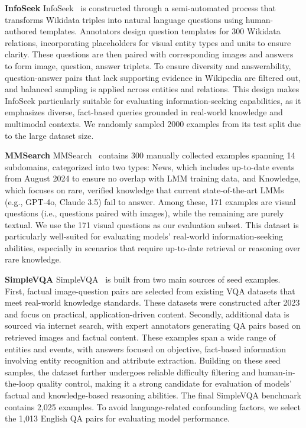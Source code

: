\documentclass{article}
\begin{document}
\textbf{InfoSeek} InfoSeek~\cite{dataset/infoseek} is constructed through a semi-automated process that transforms Wikidata triples into natural language questions using human-authored templates. Annotators design question templates for 300 Wikidata relations, incorporating placeholders for visual entity types and units to ensure clarity. These questions are then paired with corresponding images and answers to form {image, question, answer} triplets. To ensure diversity and answerability, question-answer pairs that lack supporting evidence in Wikipedia are filtered out, and balanced sampling is applied across entities and relations. This design makes InfoSeek particularly suitable for evaluating information-seeking capabilities, as it emphasizes diverse, fact-based queries grounded in real-world knowledge and multimodal contexts. We randomly sampled 2000 examples from its test split due to the large dataset size.

\textbf{MMSearch} MMSearch~\cite{vision-rag/mmsearch} contains 300 manually collected examples spanning 14 subdomains, categorized into two types: News, which includes up-to-date events from August 2024 to ensure no overlap with LMM training data, and Knowledge, which focuses on rare, verified knowledge that current state-of-the-art LMMs (e.g., GPT-4o, Claude 3.5) fail to answer. Among these, 171 examples are visual questions (i.e., questions paired with images), while the remaining are purely textual. We use the 171 visual questions as our evaluation subset. This dataset is particularly well-suited for evaluating models' real-world information-seeking abilities, especially in scenarios that require up-to-date retrieval or reasoning over rare knowledge.

\textbf{SimpleVQA} SimpleVQA~\cite{dataset/simplevqa} is built from two main sources of seed examples. First, factual image-question pairs are selected from existing VQA datasets that meet real-world knowledge standards. These datasets were constructed after 2023 and focus on practical, application-driven content. Secondly, additional data is sourced via internet search, with expert annotators generating QA pairs based on retrieved images and factual content. These examples span a wide range of entities and events, with answers focused on objective, fact-based information involving entity recognition and attribute extraction. Building on these seed samples, the dataset further undergoes reliable difficulty filtering and human-in-the-loop quality control, making it a strong candidate for evaluation of models' factual and knowledge-based reasoning abilities. The final SimpleVQA benchmark contains 2,025 examples. To avoid language-related confounding factors, we select the 1,013 English QA pairs for evaluating model performance.
\end{document}
